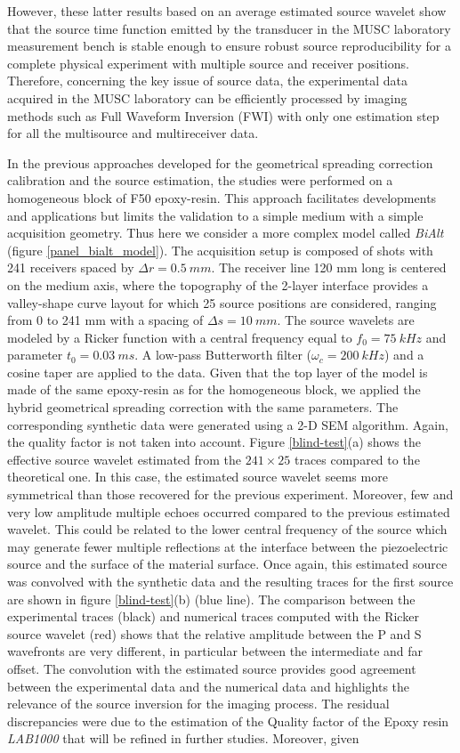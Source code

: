 \documentclass[manuscript,revised]{geophysics}
\newcommand{\twod}{2-D }
\newcommand{\bialt}{\textit{BiAlt} }
\begin{document}
\noindent However, these latter results based on an average estimated source wavelet show that the source time function emitted by the transducer in the MUSC laboratory measurement bench is stable enough to ensure robust source reproducibility for a complete physical experiment with multiple source and receiver positions. Therefore, concerning the key issue of source data, the experimental data acquired in the MUSC laboratory can be efficiently processed by imaging methods such as Full Waveform Inversion (FWI) with only one estimation step for all the multisource and multireceiver data.

\noindent In the previous approaches developed for the geometrical spreading correction calibration and the source estimation, the studies were performed on a homogeneous block of F50 epoxy-resin. This approach facilitates developments and applications but limits the validation to a simple medium with a simple acquisition geometry. Thus here we consider a more complex model called \bialt (figure \ref{panel_bialt_model}). The acquisition setup is composed of shots with 241 receivers spaced by $\Delta r=0.5\ mm$. The receiver line 120 mm long is centered on the medium axis, where the topography of the 2-layer interface provides a valley-shape curve layout for which 25 source positions are considered, ranging from 0 to 241 mm with a spacing of $\Delta s=10\ mm$. The source wavelets are modeled by a Ricker function with a central frequency equal to $f_{0}=75\ kHz$ and parameter $t_{0}=0.03\ ms$. A low-pass Butterworth filter ($\omega_{c}=200\ kHz$) and a cosine taper are applied to the data. Given that the top layer of the model is made of the same epoxy-resin as for the homogeneous block, we applied the hybrid geometrical spreading correction with the same parameters. The corresponding synthetic data were generated using a \twod SEM algorithm. Again, the quality factor is not taken into account. Figure \ref{blind-test}(a) shows the effective source wavelet estimated from the $241 \times 25$ traces compared to the theoretical one. In this case, the estimated source wavelet seems more symmetrical than those recovered for the previous experiment. Moreover, few and very low amplitude multiple echoes occurred compared to the previous estimated wavelet. This could be related to the lower central frequency of the source which may generate fewer multiple reflections at the interface between the piezoelectric source and the surface of the material surface. Once again, this estimated source was convolved with the synthetic data and the resulting traces for the first source are shown in figure \ref{blind-test}(b) (blue line). The comparison between the experimental traces (black) and numerical traces computed with the Ricker source wavelet (red) shows that the relative amplitude between the P and S wavefronts are very different, in particular between the intermediate and far offset. The convolution with the estimated source provides good agreement between the experimental data and the numerical data and highlights the relevance of the source inversion for the imaging process. The residual discrepancies were due to the estimation of the Quality factor of the Epoxy resin \textit{LAB1000} that will be refined in further studies. Moreover, given 
\end{document}
